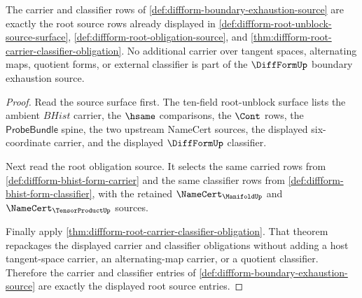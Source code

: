\begin{theorem}
\label{thm:diffform-boundary-exhaustion-carrier-coverage}
The carrier and classifier rows of
\autoref{def:diffform-boundary-exhaustion-source} are exactly the root source
rows already displayed in
\autoref{def:diffform-root-unblock-source-surface},
\autoref{def:diffform-root-obligation-source}, and
\autoref{thm:diffform-root-carrier-classifier-obligation}. No additional
carrier over tangent spaces, alternating maps, quotient forms, or external
classifier is part of the $\DiffFormUp$ boundary exhaustion source.
\end{theorem}
\begin{proof}
Read the source surface first. The ten-field root-unblock surface lists the
ambient $BHist$ carrier, the $\hsame$ comparisons, the $\Cont$ rows, the
$\mathsf{ProbeBundle}$ spine, the two upstream NameCert sources, the displayed
six-coordinate carrier, and the displayed $\DiffFormUp$ classifier.

Next read the root obligation source. It selects the same carried rows from
\autoref{def:diffform-bhist-form-carrier} and the same classifier rows from
\autoref{def:diffform-bhist-form-classifier}, with the retained
$\NameCert_{\ManifoldUp}$ and $\NameCert_{\TensorProductUp}$ sources.

Finally apply
\autoref{thm:diffform-root-carrier-classifier-obligation}. That theorem
repackages the displayed carrier and classifier obligations without adding a
host tangent-space carrier, an alternating-map carrier, or a quotient
classifier. Therefore the carrier and classifier entries of
\autoref{def:diffform-boundary-exhaustion-source} are exactly the displayed
root source entries.
\end{proof}

